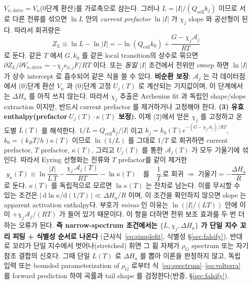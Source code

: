 \documentclass[11pt,a4paper]{article}
\newcommand{\dd}{\mathrm{d}}
\newcommand{\drive}{\mathrm{drive}}
\newcommand{\cell}{\mathrm{cell}}
\begin{document}
$V_{n,\drive}=V_n$(0단계 환산)를 가로축으로 삼는다. 그러나 $L=|I|/(Q_\cell k_j)$ 이므로 서로 다른 전류를 섞으면
$\ln L$ 안의 \emph{current prefactor} $\ln |I|$ 가 $\chi_j$ slope 와 공선형이 된다. 따라서 회귀량은
\begin{equation*}
Z_L\equiv \ln L-\ln |I|
=-\ln(Q_\cell k_0)+\frac{G-\chi_j\mathcal A_j}{RT}
\end{equation*}
로 둔다. 같은 $T$ 에서 $G,k_0$ 를 같은 local transition의 상수로 묶으면
$\partial Z_L/\partial V_{n,\drive}=-\chi_j s_{\phi,j}F/RT$ 이다. 또는 \emph{동일 $|I|$} 조건에서 전위만 sweep 하면
$\ln|I|$ 가 상수 intercept 로 흡수되어 같은 식을 쓸 수 있다. \textbf{비순환 보장}: $\mathcal A_j$ 는
각 데이터점에서 (0)단계 환산 $V_n$ 과 (0)단계 고정 $U_j(T)$ 로 계산되는 기지값이며, 이 단계에서는 $\Delta H_a$ 를 아직 쓰지 않는다.
따라서 $\chi_j$ 추출은 Arrhenius fit 과 독립인 shape/slope extraction 이지만, 반드시 current prefactor 를 제거하거나 고정해야 한다.
\textbf{(3) 유효 enthalpy(prefactor$\cdot U_j(T)\cdot\kappa(T)$ 보정).} 이제 (2)에서 얻은 $\chi_j$ 를 고정하고 온도별 $L(T)$ 를 해석한다.
$1/L=Q_\cell k_j/|I|$ 이고 $k_j=k_0(T)e^{-(G-\chi_j\mathcal A_j)/RT}$, $k_0=(k_BT/h)\kappa(T)$ 이므로
$\ln(1/L)$ 를 그대로 $1/T$ 로 회귀하면 current prefactor, $T$ prefactor, $\kappa(T)$, 그리고 $U_j(T)$ 를 통한
$\mathcal A_j(T)$ 가 모두 기울기에 섞인다. 따라서 Eyring 선형화는 전류와 $T$ prefactor를 같이 제거한
\begin{equation*}
y_\kappa(T)\equiv\ln\!\frac{|I|}{L\,T}-\frac{\chi_j\,\mathcal A_j(T)}{RT}-\ln\kappa(T)
\quad\text{를}\quad \frac1T\ \text{로 회귀} \;\Rightarrow\; \text{기울기}=-\frac{\Delta H_a}{R}
\end{equation*}
로 둔다. $\kappa(T)$ 를 독립적으로 모르면 $\ln\kappa(T)$ 는 잔차로 남는다. 이를 무시할 수 있는 조건은
$|\,\dd\ln\kappa/\dd(1/T)\,|\ll\Delta H_a/R$ 이며, 이 조건을 확인하지 않으면 slope 는 apparent activation enthalpy다.
부호가 \emph{minus} 인 이유는 $\ln(|I|/(LT))$ 안에 이미 $+\chi_j\mathcal A_j/(RT)$ 가 들어 있기 때문이다. 이 항을 더하면 전위 보조 효과를 두 번 더하는 오류가 된다.
\textbf{즉 narrow-spectrum 조건에서는 $\{L,\chi_j,\Delta H_a\}$ 가 단일 지수 꼬리 피팅 + 식별성 순서로 나온다}
(근사식~\eqref{eq:simplefit}, 식별성 \S\ref{sec:falsify}). 반대로 꼬리가 단일 지수에서 벗어나(stretched) 휘면 그 휨 자체가
$\rho_G$ spectrum 또는 자기참조 결합의 신호다. 그때 단일 $L(T)$ 로 $\Delta H_a$ 를 뽑아 이론을 판정하지 않고,
독립 입력 또는 bounded parameterization of $\rho_G$ 로부터 식~\eqref{eq:spectrum}--\eqref{eq:volterra} 를 forward prediction 하여
곡률과 tail shape 를 검정한다(반증, \S\ref{sec:falsify}).
\end{document}
